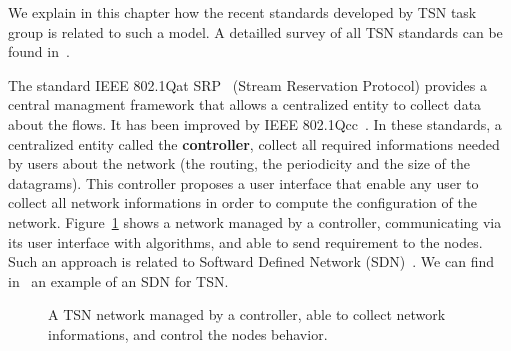 We explain in this chapter how the recent standards developed by TSN task group is related to such a model. A detailled survey of all TSN standards can be found in~\cite{8458130}. 


The standard IEEE 802.1Qat SRP~\cite{article} (Stream Reservation Protocol) provides a central managment framework that allows a centralized entity to collect data about the flows. It has been improved by IEEE 802.1Qcc~\cite{6755436}. In these standards, a centralized entity called the \textbf{controller}, collect all required informations needed by users about the network (the routing, the periodicity and the size of the datagrams). This controller proposes a user interface that enable any user to collect all network informations in order to compute the configuration of the network. Figure~\ref{fig:networkcontroller} shows a network managed by a controller, communicating via its user interface with algorithms, and able to send requirement to the nodes. Such an approach is related to Softward Defined Network (SDN)~\cite{li2015software}. We can find in~\cite{7356556} an example of an SDN for TSN.


\begin{figure}
\begin{center}


 \caption{A TSN network managed by a controller, able to collect network informations, and control the nodes behavior.}

\label{fig:networkcontroller}
\end{center}
\end{figure}


